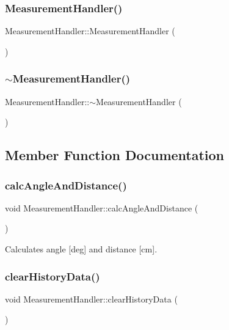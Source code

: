 \subsubsection{Measurement\+Handler()}
{\footnotesize\ttfamily Measurement\+Handler\+::\+Measurement\+Handler (\begin{DoxyParamCaption}{ }\end{DoxyParamCaption})}

\mbox{\label{class_measurement_handler_ab1f1ce3908fc0d88e350727efbd2949a}} 
\subsubsection{$\sim$\+Measurement\+Handler()}
{\footnotesize\ttfamily Measurement\+Handler\+::$\sim$\+Measurement\+Handler (\begin{DoxyParamCaption}{ }\end{DoxyParamCaption})}



\subsection{Member Function Documentation}
\mbox{\label{class_measurement_handler_a1a88ac326f78ba4ee92f4ac16cf3d2dd}} 
\subsubsection{calc\+Angle\+And\+Distance()}
{\footnotesize\ttfamily void Measurement\+Handler\+::calc\+Angle\+And\+Distance (\begin{DoxyParamCaption}{ }\end{DoxyParamCaption})}



Calculates angle [deg] and distance [cm]. 

\mbox{\label{class_measurement_handler_a4287d2123c6307d6d91790efe03f57a2}} 
\subsubsection{clear\+History\+Data()}
{\footnotesize\ttfamily void Measurement\+Handler\+::clear\+History\+Data (\begin{DoxyParamCaption}{ }\end{DoxyParamCaption})}



